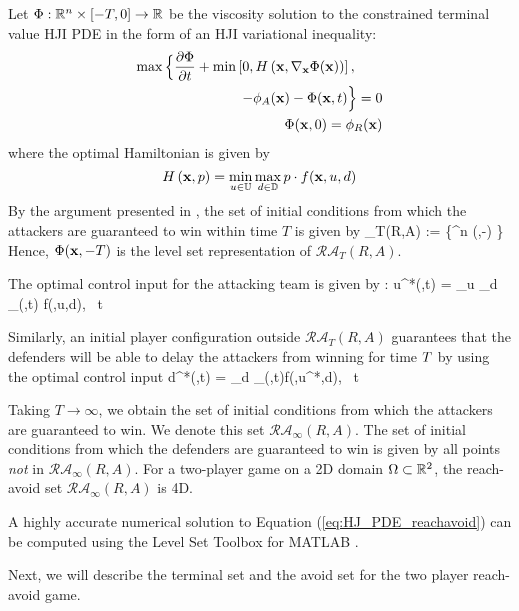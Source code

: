 Let $\Phi:\mathbb{R}^n\times[-T,0]\rightarrow\mathbb{R}$ be the viscosity solution \cite{j:Crandall-TAMS-1983} to the constrained terminal value HJI PDE in the form of an HJI variational inequality:
\begin{equation} \label{eq:HJ_PDE_reachavoid}
\begin{aligned}
	\max\Big\{\frac{\partial \Phi}{\partial t} + \min \left[0, H\left(\xj,\nabla_{\xj}\Phi(\xj)\right)\right], \qquad\\
-\valsR_A(\xj)-\Phi(\xj,t)\Big\} = 0\\
\Phi(\xj,0) = \valsR_R(\xj)	 
\end{aligned}
\end{equation}
where the optimal Hamiltonian is given by
$$H\left(\mathbf{x},p\right) = \min_{u \in \mathbb{U}} \max_{d \in \mathbb{D}} p \cdot f(\mathbf{x},u,d)$$
By the argument presented in \cite{j:mitchell-TAC-2005,mitchell-thesis,bokanowski10}, the set of initial conditions from which the attackers are guaranteed to win within time $T$ is given by 
\bq
{}_T(R,A) := \left\{\xj\in \R^n \mid \Phi (\xj,-\T) \right\}
\eq
Hence, $\Phi (\mathbf{x},-T)$ is the level set representation of $\mathcal{RA}_T(R,A)$.

The optimal control input for the attacking team is given by \cite{Huang2011,j:Lygeros-automatica-1999, j:Tomlin-ProcIEEE-2000}:
\bq \label{eq:opt_ctrl_u}
  u^*(\xj,t) = \arg \min_{u \in {}} \max_{d \in {}} \nabla_{\xj}\Phi(\xj,t) \cdot f(\xj,u,d), \!\ t \in [-T,0] 
\eq

Similarly, an initial player configuration outside $\mathcal{RA}_T(R,A)$ guarantees that the defenders will be able to delay the attackers from winning for time $T$ by using the optimal control input
\bq \label{eq:opt_ctrl_d}
  d^*(\xj,t) = \arg \max_{d \in {}} \nabla_{\xj}\Phi(\xj,t)\cdot f(\xj,u^*,d), \ t \in [-T, 0]
\eq

Taking $T\rightarrow\infty$, we obtain the set of initial conditions from which the attackers are guaranteed to win. We denote this set $\mathcal{RA}_\infty(R,A)$. The set of initial conditions from which the defenders are guaranteed to win is given by all points \textit{not} in $\mathcal{RA}_\infty(R,A)$. For a two-player game on a 2D domain $\Omega\subset\mathbb{R}^2$, the reach-avoid set $\mathcal{RA}_\infty(R,A)$ is 4D.

A highly accurate numerical solution to Equation (\ref{eq:HJ_PDE_reachavoid}) can be computed using the Level Set Toolbox for MATLAB \cite{LSToolbox}.

Next, we will describe the terminal set and the avoid set for the two player reach-avoid game.


